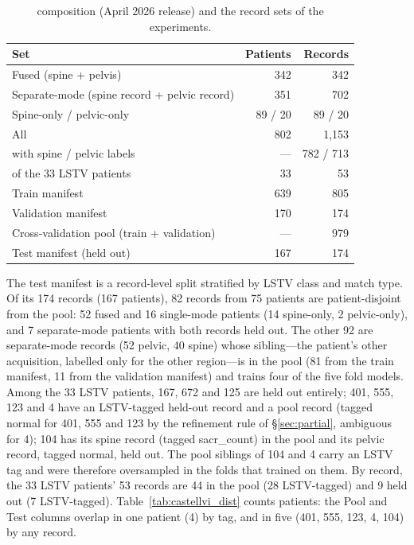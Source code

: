 \begin{table}[h]
\caption{\dataset{} composition (April 2026 release) and
the record sets of the experiments.}
\label{tab:scan_stats}
\centering
\small
\begin{tabular}{lrr}
\toprule
\bfseries Set & \bfseries Patients & \bfseries Records \\
\midrule
Fused (spine + pelvis)                         & 342 & 342 \\
Separate-mode (spine record + pelvic record)   & 351 & 702 \\
Spine-only / pelvic-only                       & 89 / 20 & 89 / 20 \\
All                                            & 802 & 1{,}153 \\
\quad with spine / pelvic labels               & --- & 782 / 713 \\
\quad of the 33 LSTV patients                  & 33 & 53 \\
\midrule
Train manifest                                 & 639 & 805 \\
Validation manifest                            & 170 & 174 \\
Cross-validation pool (train + validation)     & --- & 979 \\
Test manifest (held out)                       & 167 & 174 \\
\bottomrule
\end{tabular}
\end{table}

The test manifest is a record-level split stratified by
LSTV class and match type. Of its 174 records (167
patients), 82 records from 75 patients are
patient-disjoint from the pool: 52 fused and 16
single-mode patients (14 spine-only, 2 pelvic-only), and
7 separate-mode patients with both records held out. The
other 92 are separate-mode records (52 pelvic, 40 spine)
whose sibling---the patient's other acquisition, labelled
only for the other region---is in the pool (81 from the
train manifest, 11 from the validation manifest) and
trains four of the five fold models. Among the 33 LSTV
patients, 167, 672 and 125 are held out entirely; 401,
555, 123 and 4 have an LSTV-tagged held-out record and a
pool record (tagged normal for 401, 555 and 123 by the
refinement rule of \S\ref{sec:partial}, ambiguous for 4);
104 has its spine record (tagged sacr\_count) in the pool
and its pelvic record, tagged normal, held out. The pool
siblings of 104 and 4 carry an LSTV tag and were
therefore oversampled in the folds that trained on them.
By record, the 33 LSTV patients' 53 records are 44 in the
pool (28 LSTV-tagged) and 9 held out (7 LSTV-tagged).
Table~\ref{tab:castellvi_dist} counts patients: the Pool
and Test columns overlap in one patient (4) by tag, and in
five (401, 555, 123, 4, 104) by any record.

